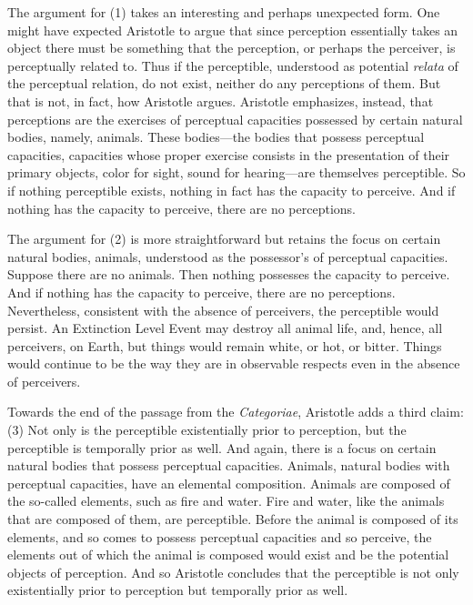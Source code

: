 The argument for (1) takes an interesting and perhaps unexpected form. One might have expected Aristotle to argue that since perception essentially takes an object there must be something that the perception, or perhaps the perceiver, is perceptually related to. Thus if the perceptible, understood as potential \emph{relata} of the perceptual relation, do not exist, neither do any perceptions of them. But that is not, in fact, how Aristotle argues. Aristotle emphasizes, instead, that perceptions are the exercises of perceptual capacities possessed by certain natural bodies, namely, animals. These bodies---the bodies that possess perceptual capacities, capacities whose proper exercise consists in the presentation of their primary objects, color for sight, sound for hearing---are themselves perceptible. So if nothing perceptible exists, nothing in fact has the capacity to perceive. And if nothing has the capacity to perceive, there are no perceptions. 

The argument for (2) is more straightforward but retains the focus on certain natural bodies, animals, understood as the possessor's of perceptual capacities. Suppose there are no animals. Then nothing possesses the capacity to perceive. And if nothing has the capacity to perceive, there are no perceptions. Nevertheless, consistent with the absence of perceivers, the perceptible would persist. An Extinction Level Event may destroy all animal life, and, hence, all perceivers, on Earth, but things would remain white, or hot, or bitter. Things would continue to be the way they are in observable respects even in the absence of perceivers.

Towards the end of the passage from the \emph{Categoriae}, Aristotle adds a third claim: (3) Not only is the perceptible existentially prior to perception, but the perceptible is temporally prior as well. And again, there is a focus on certain natural bodies that possess perceptual capacities. Animals, natural bodies with perceptual capacities, have an elemental composition. Animals are composed of the so-called elements, such as fire and water. Fire and water, like the animals that are composed of them, are perceptible. Before the animal is composed of its elements, and so comes to possess perceptual capacities and so perceive, the elements out of which the animal is composed would exist and be the potential objects of perception. And so Aristotle concludes that the perceptible is not only existentially prior to perception but temporally prior as well.

